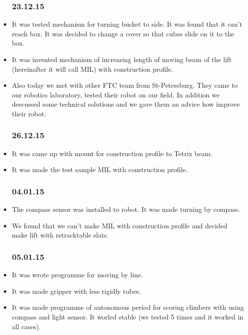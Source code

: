 \begin{itemize}
	\subsubsection{23.12.15}
		\item It was tested mechanism for turning bucket to side. It was found that it can't reach box. It was decided to change a cover so that cubes slide on it to the box.
	
		\item It was invented mechanism of increasing length of moving beam of the lift (hereinafter it will call MIL) with construction profile.
	
		\item Also today we met with other FTC team from St-Petersburg. They came to our robotics laboratory, tested their robot on our field. In addition we descussed some technical solutions and we gave them an advice how improve their robot.
	\subsubsection{26.12.15}
		\item It was came up with mount for construction profile to Tetrix beam.
		
		\item It was made the test sample MIL with construction profile.
	\subsubsection{04.01.15}
		\item The compass sensor was installed to robot. It was made turning by compass.
		
		\item We found that we can't make MIL with construction profile and decided make lift with retracktable slats.
	\subsubsection{05.01.15}
		\item It was wrote programme for moving by line.
		
		\item It was made gripper with less rigidly tubes.
		
		\item It was made programme of autonomous period for scoring climbers with using compass and light sensor. It worled stable (we tested 5 times and it worked in all cases).
		

\end{itemize}

